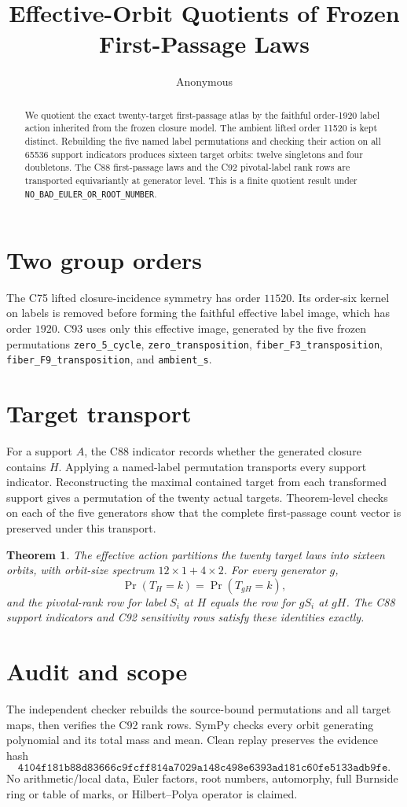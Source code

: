 \documentclass[10pt]{article}
\title{Effective-Orbit Quotients of Frozen First-Passage Laws}
\author{Anonymous}
\date{}
\newtheorem{theorem}{Theorem}
\begin{document}
\maketitle
\begin{abstract}
We quotient the exact twenty-target first-passage atlas by the faithful
order-1920 label action inherited from the frozen closure model.  The
ambient lifted order 11520 is kept distinct.  Rebuilding the five named
label permutations and checking their action on all 65536 support indicators
produces sixteen target orbits: twelve singletons and four doubletons.  The
C88 first-passage laws and the C92 pivotal-label rank rows are transported
equivariantly at generator level.  This is a finite quotient result under
\texttt{NO\_BAD\_EULER\_OR\_ROOT\_NUMBER}.
\end{abstract}

\section{Two group orders}
The C75 lifted closure-incidence symmetry has order $11520$.  Its order-six
kernel on labels is removed before forming the faithful effective label image,
which has order $1920$.  C93 uses only this effective image, generated by the
five frozen permutations
\texttt{zero\_5\_cycle}, \texttt{zero\_transposition},
\texttt{fiber\_F3\_transposition}, \texttt{fiber\_F9\_transposition}, and
\texttt{ambient\_s}.

\section{Target transport}
For a support $A$, the C88 indicator records whether the generated closure
contains $H$.  Applying a named-label permutation transports every support
indicator.  Reconstructing the maximal contained target from each transformed
support gives a permutation of the twenty actual targets.  Theorem-level
checks on each of the five generators show that the complete first-passage
count vector is preserved under this transport.

\begin{theorem}
The effective action partitions the twenty target laws into sixteen orbits,
with orbit-size spectrum $12\times1+4\times2$.  For every generator $g$,
\[
 \Pr(T_H=k)=\Pr(T_{gH}=k),
\]
and the pivotal-rank row for label $S_i$ at $H$ equals the row for $gS_i$ at
$gH$.  The C88 support indicators and C92 sensitivity rows satisfy these
identities exactly.
\end{theorem}

\section{Audit and scope}
The independent checker rebuilds the source-bound permutations and all target
maps, then verifies the C92 rank rows.  SymPy checks every orbit generating
polynomial and its total mass and mean.  Clean replay preserves the evidence
hash
\[
\texttt{4104f181b88d83666c9fcff814a7029a148c498e6393ad181c60fe5133adb9fe}.
\]
No arithmetic/local data, Euler factors, root numbers, automorphy, full
Burnside ring or table of marks, or Hilbert--Polya operator is claimed.
\end{document}
